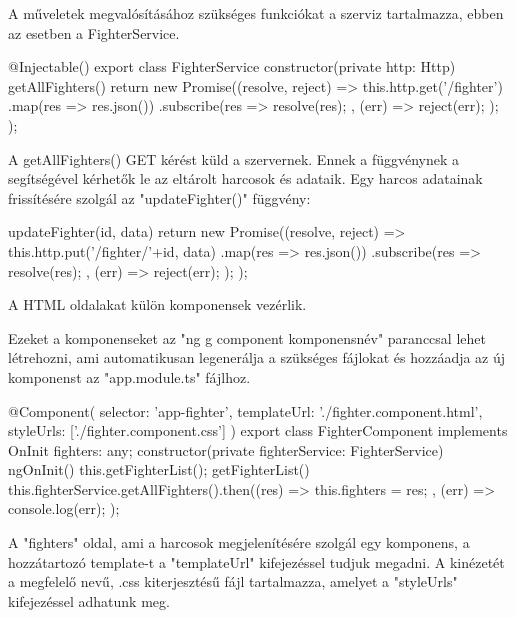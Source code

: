 

A műveletek megvalósításához szükséges funkciókat a szerviz tartalmazza, ebben az esetben a FighterService.

\begin{cpp}
@Injectable()
export class FighterService {
  constructor(private http: Http) { }
  getAllFighters() {
    return new Promise((resolve, reject) => {
      this.http.get('/fighter')
        .map(res => res.json())
        .subscribe(res => {
          resolve(res);
        }, (err) => {
          reject(err);
        });
    });  }  }
\end{cpp}

A getAllFighters() GET kérést küld a szervernek. Ennek a függvénynek a segítségével kérhetők le az eltárolt harcosok és adataik.
Egy harcos adatainak frissítésére szolgál az "updateFighter()" függvény:

\begin{cpp}
updateFighter(id, data) {
    return new Promise((resolve, reject) => {
        this.http.put('/fighter/'+id, data)
          .map(res => res.json())
          .subscribe(res => {
            resolve(res);
          }, (err) => {
            reject(err);
          });
    });
  }
\end{cpp}

A HTML oldalakat külön komponensek vezérlik.

Ezeket a komponenseket az "ng g component komponensnév" paranccsal lehet létrehozni, ami automatikusan legenerálja a szükséges fájlokat és hozzáadja az új komponenst az "app.module.ts" fájlhoz.

\begin{cpp}
@Component({
  selector: 'app-fighter',
  templateUrl: './fighter.component.html',
  styleUrls: ['./fighter.component.css']
})
export class FighterComponent implements OnInit {
  fighters: any;
  constructor(private fighterService: FighterService) { }
  ngOnInit() {
    this.getFighterList();
  }
  getFighterList() {
    this.fighterService.getAllFighters().then((res) => {
      this.fighters = res;
    }, (err) => {
      console.log(err);
    });}}
\end{cpp}

A "fighters" oldal, ami a harcosok megjelenítésére szolgál egy komponens, a hozzátartozó template-t a "templateUrl" kifejezéssel tudjuk megadni. A kinézetét a megfelelő nevű, .css kiterjesztésű fájl tartalmazza, amelyet a "styleUrls" kifejezéssel adhatunk meg.


